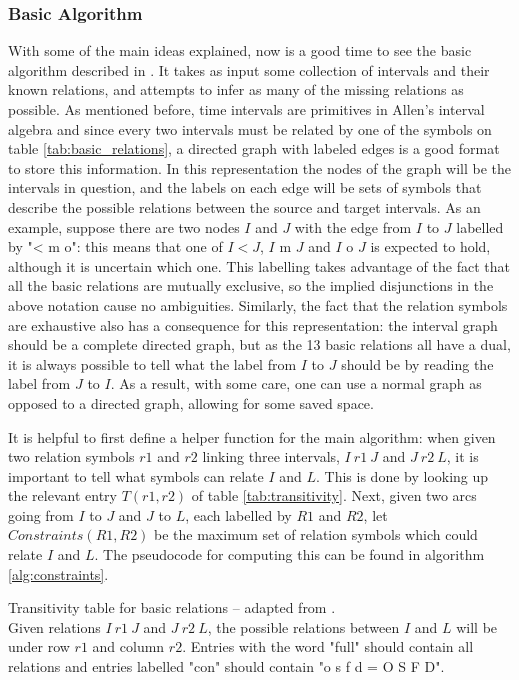 \subsubsection{Basic Algorithm}%
\label{ssub:basic_algorithm}

With some of the main ideas explained, now is a good time to see the basic algorithm described in
\cite{allen83}. It takes as input some collection of intervals and their known relations, and
attempts to infer as many of the missing relations as possible. As mentioned
before, time intervals are primitives in Allen's interval algebra and since every two intervals
must be related by one of the symbols on table \ref{tab:basic_relations}, a directed graph with
labeled edges is a good format to store this information. In this representation the nodes of the
graph will be the intervals in question, and the labels on each edge will be sets of symbols that
describe the possible relations between the source and target intervals. As an example, suppose
there are two nodes $I$ and $J$ with the edge from $I$ to $J$ labelled by "< m o": this
means that one of $I < J$, $I\text{ m }J$ and $I\text{ o }J$ is expected to hold, although it is
uncertain which one. This labelling takes advantage of the fact that all the basic relations
are mutually exclusive, so the implied disjunctions in the above notation cause no ambiguities.
Similarly, the fact that the relation symbols are exhaustive also has a consequence for this
representation: the interval graph should be a complete directed graph, but as the 13 basic
relations all have a dual, it is always possible to tell what the label from $I$ to $J$ should be
by reading the label from $J$ to $I$. As a result, with some care, one can use a normal graph
as opposed to a directed graph, allowing for some saved space.

It is helpful to first define a helper function for the main algorithm: when given two relation
symbols $r1$ and $r2$ linking three intervals, $I\ r1\ J$ and $J\ r2\ L$, it is important to tell
what symbols can relate $I$ and $L$. This is done by looking up the relevant entry $T(r1,r2)$ of
table \ref{tab:transitivity}. Next, given two arcs going from $I$ to $J$ and $J$ to $L$, each
labelled by $R1$ and $R2$, let $\textit{Constraints}(R1,R2)$ be the maximum set of relation
symbols which could relate $I$ and $L$. The pseudocode for computing this can be found in
algorithm \ref{alg:constraints}.

\begin{table}[htpb]
  \centering
  
  \caption{Transitivity table for basic relations -- adapted from \cite{thomaswebsite}.\\
  Given relations $I\ r1\ J$ and $J\ r2\ L$,
  the possible relations between $I$ and $L$ will be under row $r1$ and column $r2$. Entries
  with the word "full" should contain all relations and entries labelled "con" should contain
  "o s f d = O S F D".}
  \label{tab:transitivity}
\end{table}

